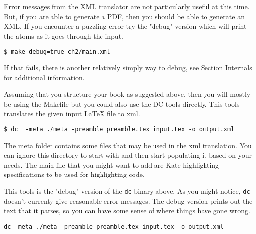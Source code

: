 \begin{gram}
Error messages from the XML translator are not particularly useful at this time.  But, if you are able to generate a PDF, then you should be able to generate an XML. If you encounter a puzzling error try the "debug" version which will print the atoms as it goes through the input.
%
\begin{lstlisting}
$ make debug=true ch2/main.xml
\end{lstlisting}

If that fails, there is another relatively simply way to debug, see \href{sec:dc::internals}{Section Internals} for additional information.
\end{gram}

\begin{gram}
Assuming that you structure your book as suggested above, then you will mostly be using the Makefile but you could also use the DC tools directly. 
%
This tools translates the given input LaTeX file to xml.

\begin{lstlisting}
$ dc  -meta ./meta -preamble preamble.tex input.tex -o output.xml
\end{lstlisting}

The meta folder contains some files that may be used in the xml translation.  You can ignore this directory to start with and then start populating it based on your needs.  The main file that you might want to add are Kate highlighting specifications to be used for highlighting code.
\end{gram}

\begin{gram}[dc.dbg] 
This tools is the "debug" version of the \lstinline`dc` binary above. As you might notice, \lstinline`dc` doesn't currenty give reasonable error messages.  The debug version prints out the text that it parses, so you can have some sense of where things have gone wrong. 

\begin{lstlisting}
dc -meta ./meta -preamble preamble.tex input.tex -o output.xml
\end{lstlisting}
\end{gram}


